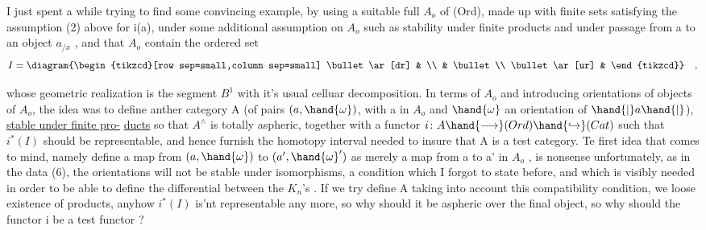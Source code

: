 
I just spent a while trying to find some convincing example,  by
using a suitable full  $A_o$ of (Ord),  made up with finite sets
satisfying the assumption (2) above for i(a),  under some additional
assumption on $A_o$  such as stability under finite products and under 
 passage from a  to an object $a_{/x}$ ,  and that $A_o$  contain
the ordered set
\[ I = \diagram{\begin{tikzcd}[row sep=small,column sep=small] \bullet \ar[dr] & \\ & \bullet \\ \bullet \ar[ur] & \end{tikzcd}} \quad , \]

whose geometric realization is the segment $B^1$  with it's usual celluar
decomposition.  In terms of $A_o$ and introducing orientations of objects
of $A_o$,  the idea was to define anther category A (of pairs $(a,\hand{\omega})$,
with  a in $A_o$ and $\hand{\omega}$ an orientation of $\hand{|}a\hand{|}$),  \uline{stable under finite pro-}%
\uline{ducts} so that $A^{\wedge}$ is totally aspheric,  together with a functor
$i\colon A \hand{\longrightarrow} (Ord) \hand{\hookrightarrow} (Cat)$  such that $i^{*}(I)$ should be representable,  and
hence furnish the homotopy interval needed to insure that A is a test
category.  Te first idea that comes to mind,  namely define a map
from $(a,\hand{\omega})$  to $(a',\hand{\omega}')$  as merely a map from a to a' in $A_o$ ,  is
nonsense unfortunately,  as in the data (6),  the orientations will not
be stable under isomorphisms,  a condition which I forgot to state
before,  and which is visibly needed in order to be able to define the
differential between the $K_n$'s .  If we try define A taking into account
this compatibility condition,  we loose existence of products,  anyhow
$i^{*}(I)$ is'nt representable any more,  so why should it be aspheric over
the final object,   so why should the functor i be a test functor ?

